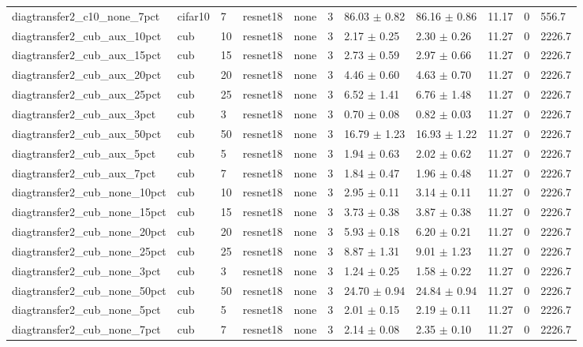\begin{tabular}{lllllllllll}
diagtransfer2_c10_none_7pct & cifar10 & 7 & resnet18 & none & 3 & 86.03 $\pm$ 0.82 & 86.16 $\pm$ 0.86 & 11.17 & 0 & 556.7 \\
diagtransfer2_cub_aux_10pct & cub & 10 & resnet18 & none & 3 & 2.17 $\pm$ 0.25 & 2.30 $\pm$ 0.26 & 11.27 & 0 & 2226.7 \\
diagtransfer2_cub_aux_15pct & cub & 15 & resnet18 & none & 3 & 2.73 $\pm$ 0.59 & 2.97 $\pm$ 0.66 & 11.27 & 0 & 2226.7 \\
diagtransfer2_cub_aux_20pct & cub & 20 & resnet18 & none & 3 & 4.46 $\pm$ 0.60 & 4.63 $\pm$ 0.70 & 11.27 & 0 & 2226.7 \\
diagtransfer2_cub_aux_25pct & cub & 25 & resnet18 & none & 3 & 6.52 $\pm$ 1.41 & 6.76 $\pm$ 1.48 & 11.27 & 0 & 2226.7 \\
diagtransfer2_cub_aux_3pct & cub & 3 & resnet18 & none & 3 & 0.70 $\pm$ 0.08 & 0.82 $\pm$ 0.03 & 11.27 & 0 & 2226.7 \\
diagtransfer2_cub_aux_50pct & cub & 50 & resnet18 & none & 3 & 16.79 $\pm$ 1.23 & 16.93 $\pm$ 1.22 & 11.27 & 0 & 2226.7 \\
diagtransfer2_cub_aux_5pct & cub & 5 & resnet18 & none & 3 & 1.94 $\pm$ 0.63 & 2.02 $\pm$ 0.62 & 11.27 & 0 & 2226.7 \\
diagtransfer2_cub_aux_7pct & cub & 7 & resnet18 & none & 3 & 1.84 $\pm$ 0.47 & 1.96 $\pm$ 0.48 & 11.27 & 0 & 2226.7 \\
diagtransfer2_cub_none_10pct & cub & 10 & resnet18 & none & 3 & 2.95 $\pm$ 0.11 & 3.14 $\pm$ 0.11 & 11.27 & 0 & 2226.7 \\
diagtransfer2_cub_none_15pct & cub & 15 & resnet18 & none & 3 & 3.73 $\pm$ 0.38 & 3.87 $\pm$ 0.38 & 11.27 & 0 & 2226.7 \\
diagtransfer2_cub_none_20pct & cub & 20 & resnet18 & none & 3 & 5.93 $\pm$ 0.18 & 6.20 $\pm$ 0.21 & 11.27 & 0 & 2226.7 \\
diagtransfer2_cub_none_25pct & cub & 25 & resnet18 & none & 3 & 8.87 $\pm$ 1.31 & 9.01 $\pm$ 1.23 & 11.27 & 0 & 2226.7 \\
diagtransfer2_cub_none_3pct & cub & 3 & resnet18 & none & 3 & 1.24 $\pm$ 0.25 & 1.58 $\pm$ 0.22 & 11.27 & 0 & 2226.7 \\
diagtransfer2_cub_none_50pct & cub & 50 & resnet18 & none & 3 & 24.70 $\pm$ 0.94 & 24.84 $\pm$ 0.94 & 11.27 & 0 & 2226.7 \\
diagtransfer2_cub_none_5pct & cub & 5 & resnet18 & none & 3 & 2.01 $\pm$ 0.15 & 2.19 $\pm$ 0.11 & 11.27 & 0 & 2226.7 \\
diagtransfer2_cub_none_7pct & cub & 7 & resnet18 & none & 3 & 2.14 $\pm$ 0.08 & 2.35 $\pm$ 0.10 & 11.27 & 0 & 2226.7 \\

\end{tabular}
